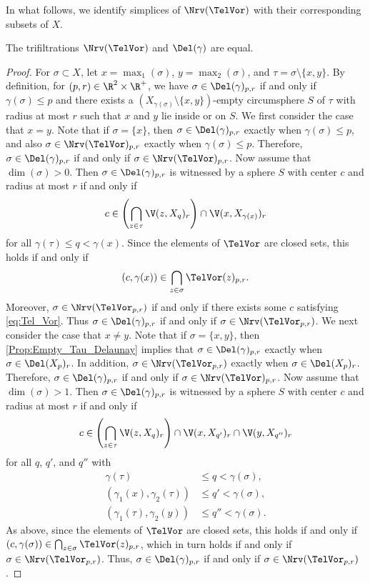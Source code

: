 %
In what follows, we identify simplices of $\Nrv(\TelVor)$ with their  corresponding subsets of $X$. 
\begin{lemma}\label{thm:deleq}
The trifiltrations $\Nrv(\TelVor)$ and  $\Del(\gamma)$ are equal.  
\end{lemma}
\begin{proof}
For $\sigma\subset X$, let $x=\max_1(\sigma)$,  $y=\max_{2}(\sigma)$, and $\tau=\sigma\setminus \{x,y\}$.  
By definition, for $(p,r)\in \R^2\times \R^+$, we have $\sigma \in \Del(\gamma)_{p,r}$ if and only if  $\gamma(\sigma)\leq p$ and there exists a $(X_{\gamma(\sigma)}\setminus \{x,y\})$-empty circumsphere $S$ of $\tau$ with radius at most $r$ such that $x$ and $y$ lie inside or on $S$.  
%
We first consider the case that $x=y$.  Note that if $\sigma=\{x\}$, then $\sigma\in \Del(\gamma)_{p,r}$ exactly when $\gamma(\sigma)\leq p$, and also $\sigma\in \Nrv(\TelVor)_{p,r}$ exactly when $\gamma(\sigma)\leq p$.  Therefore, $\sigma\in  \Del(\gamma)_{p,r}$ if and only if  $\sigma\in \Nrv(\TelVor)_{p,r}$.  Now assume that  $\dim(\sigma)>0$.  Then $\sigma \in \Del(\gamma)_{p,r}$ is witnessed by a sphere $S$ with center $c$ and radius at most $r$ if and only if 
\[c\in \left(\bigcap_{z\in \tau} \V(z,X_{q})_r\right)\cap \V(x,X_{\gamma(x)})_r\]
for all $\gamma(\tau) \leq q< \gamma(x)$.  Since the elements of $\TelVor$ are closed sets, this holds if and only if 
\begin{equation}\label{eq:Tel_Vor}
(c,\gamma(x))\in \bigcap_{z\in \sigma} \TelVor(z)_{p,r}.
\end{equation}
 Moreover, $\sigma\in \Nrv(\TelVor_{p,r})$ if and only if there exists some $c$ satisfying \eqref{eq:Tel_Vor}.  Thus $\sigma\in  \Del(\gamma)_{p,r}$ if and only if $\sigma\in \Nrv(\TelVor_{p,r})$.
%
We next consider the case that $x\ne y$.  Note that if $\sigma=\{x,y\}$, then \cref{Prop:Empty_Tau_Delaunay} implies that $\sigma\in \Del(\gamma)_{p,r}$ exactly when $\sigma\in \Del(X_{p})_r$.  In addition, $\sigma\in \Nrv(\TelVor_{p,r})$ exactly when $\sigma\in \Del(X_{p})_r$.   Therefore, $\sigma\in  \Del(\gamma)_{p,r}$ if and only if  $\sigma\in \Nrv(\TelVor)_{p,r}$.  Now assume that  $\dim(\sigma)>1$.  Then $\sigma \in \Del(\gamma)_{p,r}$ is witnessed by a sphere $S$ with center $c$ and radius at most $r$ if and only if 
\[c\in \left(\bigcap_{z\in \tau} \V(z,X_{q})_r\right)\cap \V(x,X_{q'})_r \cap  \V(y,X_{q''})_r\]
for all $q$, $q'$, and $q''$ with 
\begin{align*}
\gamma(\tau) &\leq q< \gamma(\sigma),\\
(\gamma_1(x),\gamma_2(\tau))&\leq q'< \gamma(\sigma),\\
(\gamma_1(\tau),\gamma_2(y))&\leq q''< \gamma(\sigma).
\end{align*}
As above, since the elements of $\TelVor$ are closed sets, this holds if and only if $(c,\gamma(\sigma))\in \bigcap_{z\in \sigma} \TelVor(z)_{p,r}$, which in turn holds if and only if $\sigma \in  \Nrv(\TelVor_{p,r})$.  Thus, $\sigma\in  \Del(\gamma)_{p,r}$ if and only if $\sigma\in \Nrv(\TelVor_{p,r})$.
\end{proof}

